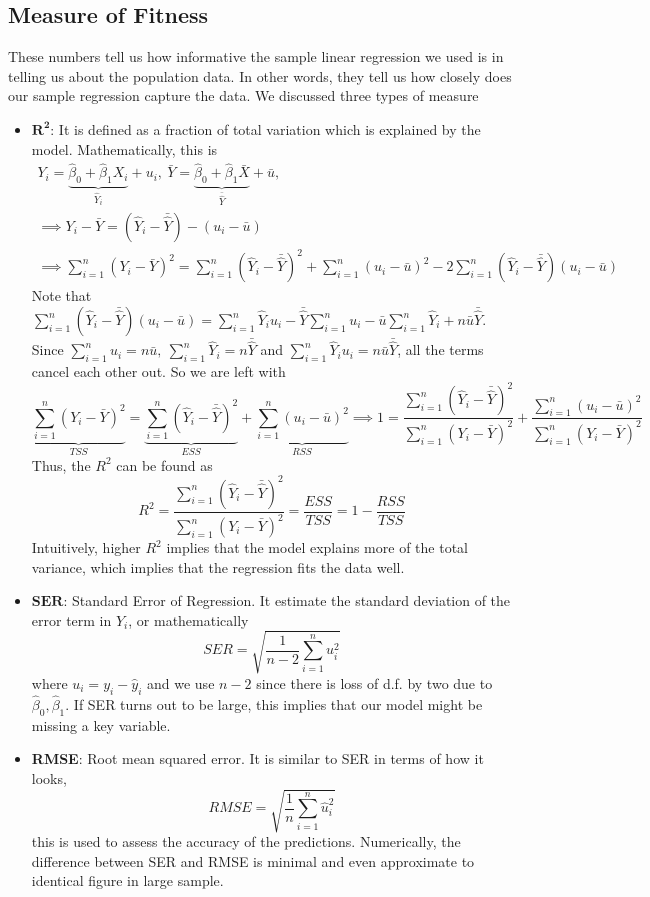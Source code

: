 \documentclass[12pt]{article}
\theoremstyle{definition}
\theoremstyle{property}
\theoremstyle{assumption}
\theoremstyle{example}
\theoremstyle{comment}
\begin{document}
\subsection{Measure of Fitness}
These numbers tell us how informative the sample linear regression we used is in telling us about the population data. In other words, they tell us how closely does our sample regression capture the data. We discussed three types of measure
\begin{itemize}
\item $\mathbf{R^2}$: It is defined as a fraction of total variation which is explained by the model. Mathematically, this is
\begin{gather*}
Y_i = \underbrace{\hat{\beta}_0 + \hat{\beta}_1X_i}_{\hat{Y}_i} + u_i, \ \bar{Y} = \underbrace{\hat{\beta}_0 + \hat{\beta}_1\bar{X}}_{\bar{\hat{Y}}} + \bar{u}, \\
\implies Y_i-\bar{Y} = (\hat{Y}_i - \bar{\hat{Y}}) - (u_i - \bar{u}) \\
\implies \sum_{i=1}^n (Y_i-\bar{Y})^2= \sum_{i=1}^n (\hat{Y}_i - \bar{\hat{Y}})^2+\sum_{i=1}^n(u_i - \bar{u})^2 - 2\sum_{i=1}^n(\hat{Y}_i - \bar{\hat{Y}}) (u_i - \bar{u})
\end{gather*}
Note that $\sum_{i=1}^n(\hat{Y}_i - \bar{\hat{Y}}) (u_i - \bar{u})=\sum_{i=1}^n\hat{Y}_i{u}_i-\bar{\hat{Y}}\sum_{i=1}^nu_i -\bar{u}\sum_{i=1}^n\hat{Y}_i +n\bar{u}\bar{\hat{Y}}$. Since $\sum_{i=1}^nu_i = n\bar{u},\ \sum_{i=1}^n\hat{Y}_i = n\bar{\hat{Y}}$ and $\sum_{i=1}^n\hat{Y}_iu_i=n\bar{u}\bar{\hat{Y}}$, all the terms cancel each other out. So we are left with
\[
\underbrace{\sum_{i=1}^n (Y_i-\bar{Y})^2}_{TSS}= \underbrace{\sum_{i=1}^n (\hat{Y}_i - \bar{\hat{Y}})^2}_{ESS}+\underbrace{\sum_{i=1}^n(u_i - \bar{u})^2}_{RSS} \implies 1=\frac{\sum_{i=1}^n (\hat{Y}_i - \bar{\hat{Y}})^2}{\sum_{i=1}^n (Y_i-\bar{Y})^2} + \frac{\sum_{i=1}^n(u_i - \bar{u})^2 }{\sum_{i=1}^n (Y_i-\bar{Y})^2}
\]
Thus, the $R^2$ can be found as
\[
R^2 = \frac{\sum_{i=1}^n (\hat{Y}_i - \bar{\hat{Y}})^2}{\sum_{i=1}^n (Y_i-\bar{Y})^2} = \frac{ESS}{TSS} = 1-\frac{RSS}{TSS}
\]
Intuitively, higher $R^2$ implies that the model explains more of the total variance, which implies that the regression fits the data well. 
\item $\mathbf{SER}$: Standard Error of Regression. It estimate the standard deviation of the error term in $Y_i$, or mathematically
\[
SER = \sqrt{\frac{1}{n-2}\sum_{i=1}^n u_i^2}
\]
where $u_i = y_i-\hat{y}_i$ and we use $n-2$ since there is loss of d.f. by two due to $\hat{\beta}_0, \hat{\beta}_1$. If SER turns out to be large, this implies that our model might be missing a key variable.

 \item \textbf{RMSE}: Root mean squared error. It is similar to SER in terms of how it looks, 
\[
RMSE = \sqrt{\frac{1}{n}\sum_{i=1}^n \hat{u}_i^2}
\]
this is used to assess the accuracy of the predictions. Numerically, the difference between SER and RMSE is minimal and even approximate to identical figure in large sample. 
\end{itemize}

\end{document}
